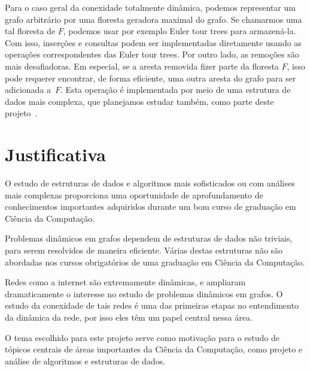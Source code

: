 \documentclass[12pt]{article}
\begin{document}
Para o caso geral da conexidade totalmente dinâmica, podemos representar um grafo arbitrário  
por uma floresta geradora maximal do grafo.  Se chamarmos uma tal floresta de $F$, podemos 
usar por exemplo Euler tour trees para armazená-la.  Com isso, inserções e consultas podem 
ser implementadas diretamente usando as operações correspondentes das Euler tour trees.  
Por outro lado, as remoções são mais desafiadoras.  Em especial, se a aresta removida fizer
parte da floresta $F$, isso pode requerer encontrar, de forma eficiente, uma outra aresta 
do grafo para ser adicionada a~$F$.  Esta operação é implementada por meio de uma estrutura
de dados mais complexa, que planejamos estudar também, como parte deste projeto~\cite{DemaineL2007}. 

\section{Justificativa}

O estudo de estruturas de dados e algoritmos mais sofisticados ou com análises
mais complexas proporciona uma oportunidade de aprofundamento de conhecimentos 
importantes adquiridos durante um bom curso de graduação em Ciência da Computação.

Problemas dinâmicos em grafos dependem de estruturas de dados não triviais, para 
serem resolvidos de maneira eficiente.  Várias destas estruturas não são abordadas 
nos cursos obrigatórios de uma graduação em Ciência da Computação. 

Redes como a internet são extremamente dinâmicas, e ampliaram dramaticamente o 
interesse no estudo de problemas dinâmicos em grafos.  O estudo da conexidade 
de tais redes é uma das primeiras etapas no entendimento da dinâmica da rede, 
por isso eles têm um papel central nessa área. 

O tema escolhido para este projeto serve como motivação para o estudo de tópicos 
centrais de áreas importantes da Ciência da Computação, como projeto e análise 
de algoritmos e estruturas de dados. 

\end{document}
